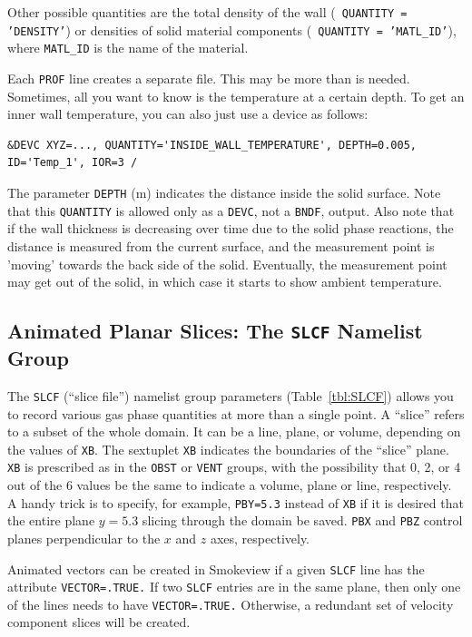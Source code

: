 \documentclass[11pt]{book}
\newcommand{\ct}{\tt\small}
\begin{document}
\noindent
{}
Other possible quantities are the total density of the wall ({\ct
QUANTITY = 'DENSITY'}) or densities of solid material components ({\ct
QUANTITY = 'MATL\_ID'}), where {\ct MATL\_ID} is the name of the
material.

Each {\ct PROF} line creates a separate file. This may be more than is
needed. Sometimes, all you want to know is the temperature at a
certain depth. To get an inner wall temperature, you can also just use
a device as follows:

\footnotesize
\begin{verbatim}
&DEVC XYZ=..., QUANTITY='INSIDE_WALL_TEMPERATURE', DEPTH=0.005, ID='Temp_1', IOR=3 /
\end{verbatim} \normalsize

\noindent
The parameter {\ct DEPTH} (m) indicates the distance inside the solid surface.
Note that this {\ct QUANTITY} is allowed only as a {\ct DEVC}, not a
{\ct BNDF}, output. Also note that if the wall thickness is decreasing
over time due to the solid phase reactions, the distance is
measured from the current surface, and the measurement point is
'moving' towards the back side of the solid. Eventually, the
measurement point may get out of the solid, in which case it starts to
show ambient temperature.


\subsection{Animated Planar Slices: The \texorpdfstring{{\tt SLCF}}{SLCF} Namelist Group}%
\label{info:SLCF}

The {\ct SLCF} (``slice file'') namelist group parameters (Table~\ref{tbl:SLCF})
allows you to record various gas phase quantities
at more than a single point. A ``slice'' refers to a subset of the whole domain. It can be a line,
plane, or volume, depending on the values of {\ct XB}.
The sextuplet {\ct XB} indicates the boundaries of the ``slice'' plane.
{\ct XB} is prescribed as in the {\ct OBST} or {\ct VENT} groups, with
the possibility that 0, 2, or 4 out of the 6 values be the same to
indicate a volume, plane or line, respectively. A handy trick is to
specify, for example, {\ct PBY=5.3} instead of {\ct XB} if it is desired
that the entire plane $y=5.3$ slicing through the domain be saved.
{\ct PBX} and {\ct PBZ} control planes perpendicular to the
$x$ and $z$ axes, respectively.

Animated vectors can be created in Smokeview if a given {\ct SLCF} line has the attribute {\ct VECTOR=.TRUE.} If two {\ct SLCF}
entries are in the same plane, then only one of the lines needs to have {\ct VECTOR=.TRUE.} Otherwise, a redundant set of velocity
component slices will be created.
\end{document}
